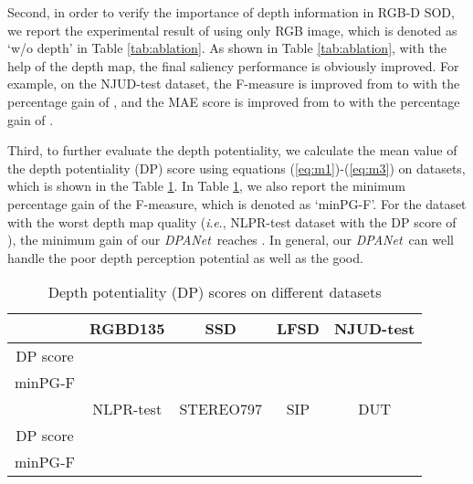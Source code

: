 \documentclass[journal]{IEEEtran}
\def\OURNET{\textit{DPANet}}
\newcommand{\ie}{\textit{i}.\textit{e}.}
\begin{document}
Second, in order to verify the importance of depth information in RGB-D SOD, we report the experimental result of using only RGB image, which is denoted as `w/o depth' in Table \ref{tab:ablation}. As shown in Table \ref{tab:ablation}, with the help of the depth map, the final saliency performance is obviously improved. For example, on the NJUD-test dataset, the F-measure is improved from  to  with the percentage gain of , and the MAE score is improved from  to  with the percentage gain of .

Third, to further evaluate the depth potentiality, we calculate the mean value of the depth potentiality (DP) score using equations (\ref{eq:m1})-(\ref{eq:m3}) on  datasets, which is shown in the Table \ref{tab:dp}. In Table \ref{tab:dp}, we also report the minimum percentage gain of the F-measure, which is denoted as `minPG-F'. For the dataset with the worst depth map quality (\ie, NLPR-test dataset with the DP score of ), the minimum gain of our \OURNET\ reaches . In general, our \OURNET\ can well handle the poor depth perception potential as well as the good.





\begin{table}[!t]
    \centering
    \normalsize
    \caption{Depth potentiality (DP) scores on different datasets}
    \setlength{\tabcolsep}{1.2mm}
{
    \begin{tabular}{|c|c|c|c|c|}
        \hline
         &  RGBD135 & SSD & LFSD & NJUD-test \\
         \hline
         DP score &  &  &  &  \\
         \hline
         minPG-F &  &  &  &  \\
         \hline
         & NLPR-test & STEREO797 & SIP & DUT\\
         \hline
         DP score &  &  &  &  \\
         \hline
         minPG-F &  &  &  &  \\
         \hline
    \end{tabular}}
    \label{tab:dp}
\end{table}
\end{document}
